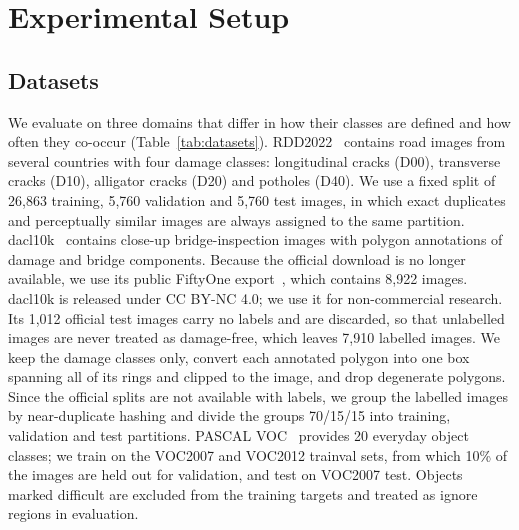 \documentclass[conference]{IEEEtran}
\begin{document}
\section{Experimental Setup}
\label{sec:setup}

\subsection{Datasets}
\label{sec:setup_data}

We evaluate on three domains that differ in how their classes are defined and how often they co-occur (Table~\ref{tab:datasets}). RDD2022~\cite{arya2024rdd} contains road images from several countries with four damage classes: longitudinal cracks (D00), transverse cracks (D10), alligator cracks (D20) and potholes (D40). We use a fixed split of 26,863 training, 5,760 validation and 5,760 test images, in which exact duplicates and perceptually similar images are always assigned to the same partition. dacl10k~\cite{flotzinger2024dacl10k} contains close-up bridge-inspection images with polygon annotations of damage and bridge components. Because the official download is no longer available, we use its public FiftyOne export~\cite{voxel51dacl10k}, which contains 8,922 images. dacl10k is released under CC BY-NC 4.0; we use it for non-commercial research. Its 1,012 official test images carry no labels and are discarded, so that unlabelled images are never treated as damage-free, which leaves 7,910 labelled images. We keep the damage classes only, convert each annotated polygon into one box spanning all of its rings and clipped to the image, and drop degenerate polygons. Since the official splits are not available with labels, we group the labelled images by near-duplicate hashing and divide the groups 70/15/15 into training, validation and test partitions. PASCAL VOC~\cite{everingham2010voc} provides 20 everyday object classes; we train on the VOC2007 and VOC2012 trainval sets, from which 10\% of the images are held out for validation, and test on VOC2007 test. Objects marked difficult are excluded from the training targets and treated as ignore regions in evaluation.
\end{document}
